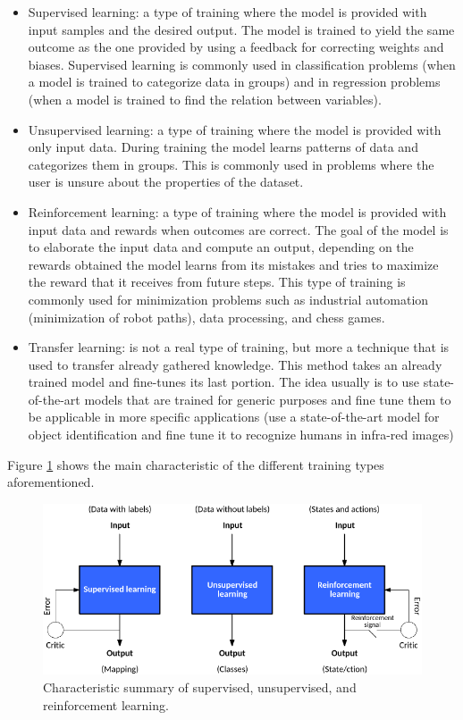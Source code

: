 \documentclass[12pt]{report}
\begin{document}
\begin{itemize}
\item Supervised learning: a type of training where the model is provided with input samples and the desired output. The model is trained to yield the same outcome as the one provided by using a feedback for correcting weights and biases. Supervised learning is commonly used in classification problems (when a model is trained to categorize data in groups) and in regression problems (when a model is trained to find the relation between variables).
\item Unsupervised learning: a type of training where the model is provided with only input data. During training the model learns patterns of data and categorizes them in groups. This is commonly used in problems where the user is unsure about the properties of the dataset.
\item Reinforcement learning: a type of training where the model is provided with input data and rewards when outcomes are correct. The goal of the model is to elaborate the input data and compute an output, depending on the rewards obtained the model learns from its mistakes and tries to maximize the reward that it receives from future steps. This type of training is commonly used for minimization problems such as industrial automation (minimization of robot paths), data processing, and chess games.
\item Transfer learning: is not a real type of training, but more a technique that is used to transfer already gathered knowledge. This method takes an already trained model and fine-tunes its last portion. The idea usually is to use state-of-the-art models that are trained for generic purposes and fine tune them to be applicable in more specific applications (use a state-of-the-art model for object identification and fine tune it to recognize humans in infra-red images)
\end{itemize}

Figure \ref{fig:supervised} shows the main characteristic of the different training types aforementioned.

\begin{figure}[h!]
    \centering
    \includegraphics[width=140mm]{Figures/Chapter1/supervised.png} 
    \caption{Characteristic summary of supervised, unsupervised, and reinforcement learning.}
    \label{fig:supervised}    
\end{figure}
\end{document}

